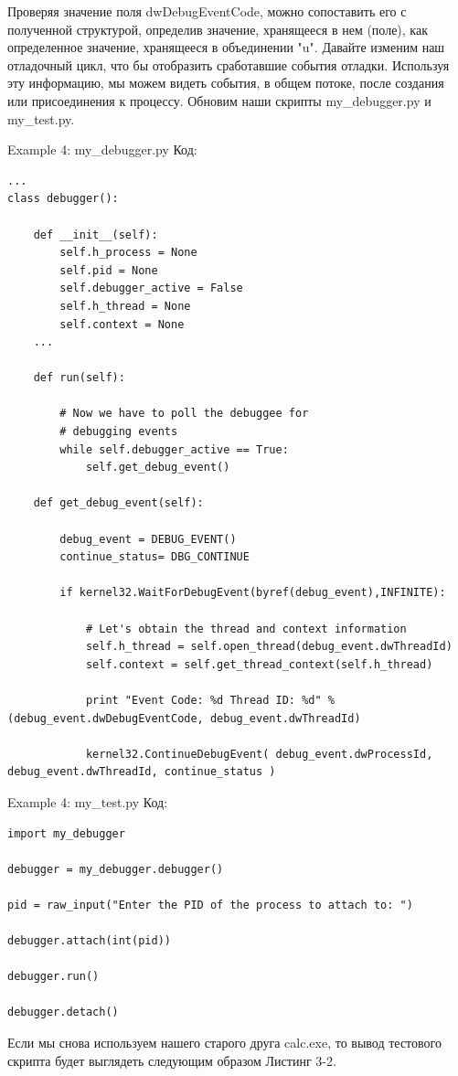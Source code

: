 \documentclass[12pt, a4paper, oneside]{book}
\begin{document}
Проверяя значение поля dwDebugEventCode, можно сопоставить его с полученной структурой, определив значение, хранящееся в нем (поле), как определенное значение, хранящееся в объединении "u". Давайте изменим наш отладочный цикл, что бы отобразить сработавшие события отладки. Используя эту информацию, мы можем видеть события, в общем потоке, после создания или присоединения к процессу. Обновим наши скрипты my\_debugger.py и my\_test.py.

Example 4: my\_debugger.py
Код:
\begin{verbatim}
...
class debugger():

    def __init__(self):
        self.h_process = None
        self.pid = None
        self.debugger_active = False
        self.h_thread = None
        self.context = None
    ...

    def run(self):
        
        # Now we have to poll the debuggee for 
        # debugging events           
        while self.debugger_active == True:
            self.get_debug_event()

    def get_debug_event(self):

        debug_event = DEBUG_EVENT()
        continue_status= DBG_CONTINUE

        if kernel32.WaitForDebugEvent(byref(debug_event),INFINITE):

            # Let's obtain the thread and context information
            self.h_thread = self.open_thread(debug_event.dwThreadId)
            self.context = self.get_thread_context(self.h_thread)

            print "Event Code: %d Thread ID: %d" % (debug_event.dwDebugEventCode, debug_event.dwThreadId)

            kernel32.ContinueDebugEvent( debug_event.dwProcessId, debug_event.dwThreadId, continue_status )
\end{verbatim}

Example 4: my\_test.py
Код:
\begin{verbatim}
import my_debugger

debugger = my_debugger.debugger()

pid = raw_input("Enter the PID of the process to attach to: ")

debugger.attach(int(pid))

debugger.run()

debugger.detach()
\end{verbatim}

Если мы снова используем нашего старого друга calc.exe, то вывод тестового скрипта будет выглядеть следующим образом Листинг 3-2.
\end{document}
